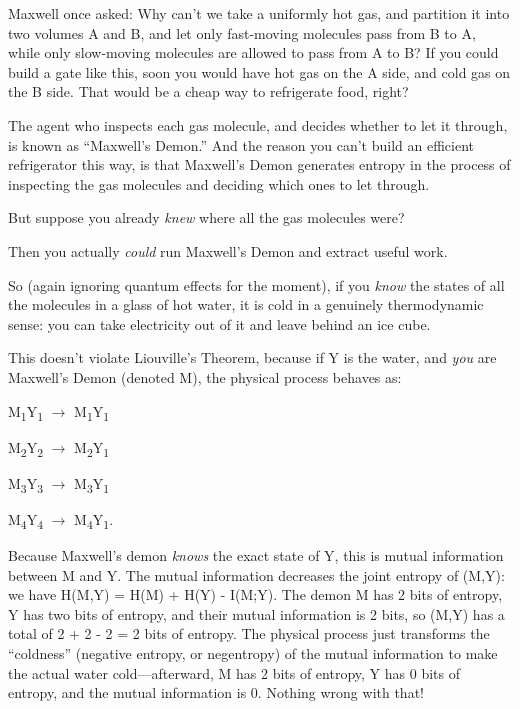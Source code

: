 {
 Maxwell once asked: Why can't we take a uniformly
hot gas, and partition it into two volumes A and B, and let only
fast-moving molecules pass from B to A, while only slow-moving
molecules are allowed to pass from A to B? If you could build a gate
like this, soon you would have hot gas on the A side, and cold gas on
the B side. That would be a cheap way to refrigerate food, right?}

{
 The agent who inspects each gas molecule, and decides whether to
let it through, is known as
``Maxwell's Demon.''
And the reason you can't build an efficient
refrigerator this way, is that Maxwell's Demon
generates entropy in the process of inspecting the gas molecules and
deciding which ones to let through.}

{
 But suppose you already \textit{knew} where all the gas molecules
were?}

{
 Then you actually \textit{could} run Maxwell's
Demon and extract useful work.}

{
 So (again ignoring quantum effects for the moment), if you
\textit{know} the states of all the molecules in a glass of hot water,
it is cold in a genuinely thermodynamic sense: you can take electricity
out of it and leave behind an ice cube.}

{
 This doesn't violate Liouville's
Theorem, because if Y is the water, and \textit{you} are
Maxwell's Demon (denoted M), the physical process
behaves as:}

{\centering
 M\textsubscript{1}Y\textsubscript{1} $\rightarrow $
M\textsubscript{1}Y\textsubscript{1}
\par}


\bigskip

{\centering
 M\textsubscript{2}Y\textsubscript{2} $\rightarrow $
M\textsubscript{2}Y\textsubscript{1}
\par}


\bigskip

{\centering
 M\textsubscript{3}Y\textsubscript{3} $\rightarrow $
M\textsubscript{3}Y\textsubscript{1}
\par}


\bigskip

{\centering
 M\textsubscript{4}Y\textsubscript{4} $\rightarrow $
M\textsubscript{4}Y\textsubscript{1}.
\par}


\bigskip

{
 Because Maxwell's demon \textit{knows} the exact
state of Y, this is mutual information between M and Y. The mutual
information decreases the joint entropy of (M,Y): we have H(M,Y) = H(M)
+ H(Y) - I(M;Y). The demon M has 2 bits of entropy, Y has two bits of
entropy, and their mutual information is 2 bits, so (M,Y) has a total
of 2 + 2 - 2 = 2 bits of entropy. The physical process just transforms
the ``coldness'' (negative entropy,
or negentropy) of the mutual information to make the actual water
cold---afterward, M has 2 bits of entropy, Y has 0 bits of entropy, and
the mutual information is 0. Nothing wrong with that!}

